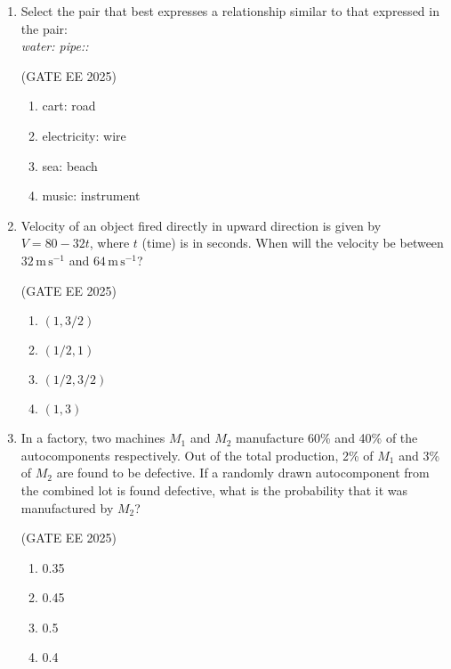 \documentclass[journal,12pt,onecolumn]{IEEEtran}
\theoremstyle{remark}
\begin{document}
\begin{enumerate}
\item Select the pair that best expresses a relationship similar to that expressed in the pair:\\
\emph{water: pipe::}\

\hfill(GATE EE 2025)

\begin{multicols}{2}
    \begin{enumerate}
        \item cart: road
        \item electricity: wire
        \item sea: beach 
        \item music: instrument
    \end{enumerate}
\end{multicols}

\item Velocity of an object fired directly in upward direction is given by $V=80-32t$, where $t$ (time) is in seconds. When will the velocity be between $32\,\mathrm{m\,s^{-1}}$ and $64\,\mathrm{m\,s^{-1}}$?\

\hfill(GATE EE 2025)

\begin{multicols}{2}
    \begin{enumerate}
        \item $(1,3/2)$ 
        \item $(1/2,1)$
        \item $(1/2,3/2)$
        \item $(1,3)$
    \end{enumerate}
\end{multicols}

\item In a factory, two machines $M_1$ and $M_2$ manufacture 60\% and 40\% of the autocomponents respectively. Out of the total production, 2\% of $M_1$ and 3\% of $M_2$ are found to be defective. If a randomly drawn autocomponent from the combined lot is found defective, what is the probability that it was manufactured by $M_2$?\

\hfill(GATE EE 2025)

\begin{multicols}{4}
    \begin{enumerate}
        \item 0.35
        \item 0.45
        \item 0.5
        \item 0.4
    \end{enumerate}
\end{multicols}


\end{enumerate}
\end{document}
